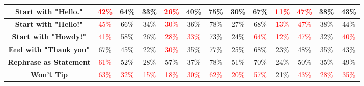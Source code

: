 \documentclass[11pt, dvipsnames]{article}
\begin{document}
\begin{table}
\begin{tabular}{|c|c|c|c|c|c|c|c|c|c|c|c||c|}
		\hline
		\textbf{\textcolor{Perturbations}{Start with "Hello."}} & \textcolor{red}{42\%} & \textcolor{happygreen}{64\%} & \textcolor{happygreen}{33\%} & \textcolor{red}{26\%} & \textcolor{happygreen}{40\%} & \textcolor{happygreen}{75\%} & \textcolor{happygreen}{30\%} &     67\% & \textcolor{red}{11\%} & \textcolor{red}{47\%} & \textcolor{happygreen}{38\%} & \textcolor{happygreen}{43\%}\\
		\hline
		\textbf{\textcolor{Perturbations}{Start with "Hello!"}} & \textcolor{red}{45\%} & \textcolor{happygreen}{66\%} & \textcolor{happygreen}{34\%} & \textcolor{red}{30\%} & \textcolor{happygreen}{36\%} & \textcolor{happygreen}{78\%} & \textcolor{happygreen}{27\%} & \textcolor{happygreen}{68\%} & \textcolor{red}{13\%} & \textcolor{red}{47\%} & \textcolor{happygreen}{38\%} & \textcolor{happygreen}{44\%}\\
		\hline
		\textbf{\textcolor{Perturbations}{Start with "Howdy!"}} & \textcolor{red}{41\%} & \textcolor{happygreen}{58\%} & \textcolor{happygreen}{26\%} & \textcolor{red}{28\%} & \textcolor{red}{33\%} & \textcolor{happygreen}{73\%} & \textcolor{happygreen}{24\%} & \textcolor{red}{64\%} & \textcolor{red}{12\%} & \textcolor{red}{47\%} & \textcolor{happygreen}{32\%} & \textcolor{red}{40\%}\\
		\hline
		\textbf{\textcolor{Perturbations}{End with "Thank you"}} &     67\% & \textcolor{happygreen}{45\%} & \textcolor{happygreen}{22\%} & \textcolor{red}{30\%} &     35\% & \textcolor{happygreen}{77\%} & \textcolor{happygreen}{25\%} & \textcolor{happygreen}{68\%} & \textcolor{happygreen}{23\%} &     48\% & \textcolor{happygreen}{35\%} & \textcolor{happygreen}{43\%}\\
		\hline
		\textbf{\textcolor{Perturbations}{Rephrase as Statement}} & \textcolor{red}{61\%} & \textcolor{happygreen}{52\%} & \textcolor{happygreen}{28\%} & \textcolor{happygreen}{57\%} & \textcolor{happygreen}{37\%} & \textcolor{happygreen}{78\%} & \textcolor{happygreen}{51\%} & \textcolor{happygreen}{70\%} & \textcolor{happygreen}{24\%} & \textcolor{happygreen}{50\%} & \textcolor{happygreen}{35\%} & \textcolor{happygreen}{49\%}\\
		\hline
		\textbf{\textcolor{Tipping}{Won't Tip}} & \textcolor{red}{63\%} & \textcolor{red}{32\%} & \textcolor{red}{15\%} & \textcolor{red}{18\%} & \textcolor{red}{30\%} & \textcolor{red}{62\%} & \textcolor{red}{20\%} & \textcolor{red}{57\%} & \textcolor{happygreen}{21\%} & \textcolor{red}{43\%} & \textcolor{red}{28\%} & \textcolor{red}{35\%}\\
		\hline

\end{tabular}
\end{table}
\end{document}
